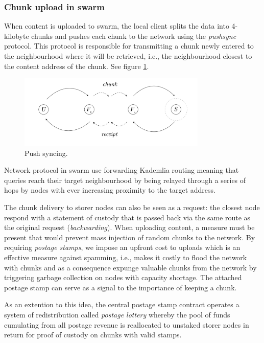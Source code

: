 \subsubsection{Chunk upload in swarm}

When content is uploaded to swarm, the local client splits the data into 4-kilobyte chunks and pushes each chunk to the network using the \emph{pushsync} protocol. This protocol is responsible for transmitting a chunk newly entered to the neighbourhood where it will be retrieved, i.e., the neighbourhood closest to the content address of the chunk. See figure \ref{fig:pushsync}. 

\begin{figure}[htbp]
  \centering
    \includegraphics[width=0.8\textwidth]{figs/push-sync.pdf}
  \caption{Push syncing.}
\label{fig:pushsync}
\end{figure}



Network protocol in swarm use forwarding Kademlia routing meaning that queries reach their target neighbourhood by being relayed through a series of hops by nodes with ever increasing proximity to the target address.

The chunk delivery to storer nodes can also be seen as a request: the closest node respond with a statement of custody that is passed back via the same route as the original request (\emph{backwarding}). 
When uploading content, a measure must be present that would prevent mass injection of random chunks to the network. By requiring \emph{postage stamps}, we impose an upfront cost to uploads which is an effective measure against spamming, i.e., makes it costly to flood the network with chunks and as a consequence expunge valuable chunks from the network by triggering garbage collection on nodes with  capacity shortage. The attached postage stamp can serve as a signal to the  importance of keeping a chunk.

As an extention to this idea, the central postage stamp contract operates a system of redistribution called \emph{postage lottery}  whereby the pool of funds cumulating from all postage revenue is reallocated to unstaked storer nodes in return for proof of custody on chunks with valid stamps.

